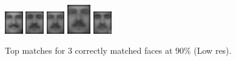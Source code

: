\begin{figure}[hbt]
  \includegraphics[width=0.07\textwidth]{../results/L_rez/correct90/3/6.jpg}
  \includegraphics[width=0.07\textwidth]{../results/L_rez/correct90/3/7.jpg}
  \includegraphics[width=0.07\textwidth]{../results/L_rez/correct90/3/8.jpg}
  \includegraphics[width=0.09\textwidth]{../results/L_rez/correct90/3/8.jpg}
  \includegraphics[width=0.07\textwidth]{../results/L_rez/correct90/3/10.jpg}
  \caption{Top matches for 3 correctly matched faces at 90\% (Low res).}
  \label{fig:correct90_l}
\end{figure}

~\vfill

